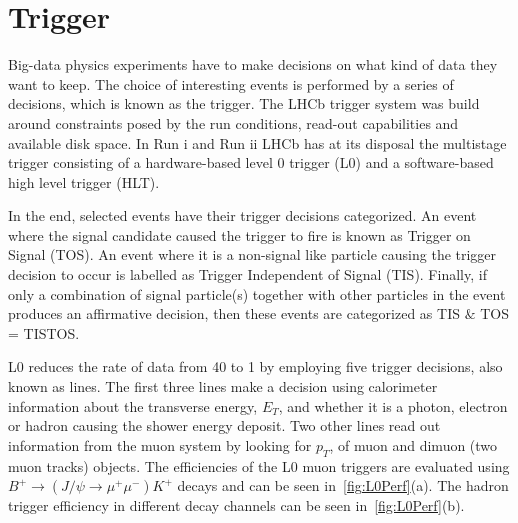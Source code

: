 \section{Trigger }
\label{triggerchap}
Big-data physics experiments have to make decisions on what kind of data they want to keep. The choice of interesting events is performed by a series of decisions, which is known as the trigger. The \Gls{LHCb} trigger system was build around constraints posed by the run conditions, read-out capabilities and available disk space. In Run \Rn{1} and Run \Rn{2} \gls{LHCb} has at its disposal the multistage trigger consisting of a hardware-based level 0 trigger (\Gls{L0}) and a software-based high level trigger (\Gls{HLT}).

In the end, selected events have their trigger decisions categorized. An event where the signal candidate caused the trigger to fire is known as Trigger on Signal (\Gls{TOS}). An event where it is a non-signal like particle causing the trigger decision to occur is labelled as Trigger Independent of Signal (\Gls{TIS}). Finally, if only a combination of signal particle(s) together with other particles in the event produces an affirmative decision, then these events are categorized as \Gls{TIS} $\&$ \Gls{TOS} = \Gls{TISTOS}.

\Gls{L0} reduces the rate of data from 40 \mhz to 1 \mhz by employing five trigger decisions, also known as lines. The first three lines make a decision using calorimeter information about the transverse energy, $E_{T}$, and whether it is a photon, electron or hadron causing the shower energy deposit. Two other lines read out information from the muon system by looking for  $p_{T}$, of muon and dimuon (two muon tracks) objects. The efficiencies of the L0 muon triggers are evaluated using $B^{+} \rightarrow (J/\psi \rightarrow \mu^{+} \mu^{-}) K^{+}$ decays and can be seen in~\autoref{fig:L0Perf}(a). The hadron trigger efficiency in different decay channels can be seen in~\autoref{fig:L0Perf}(b). 


